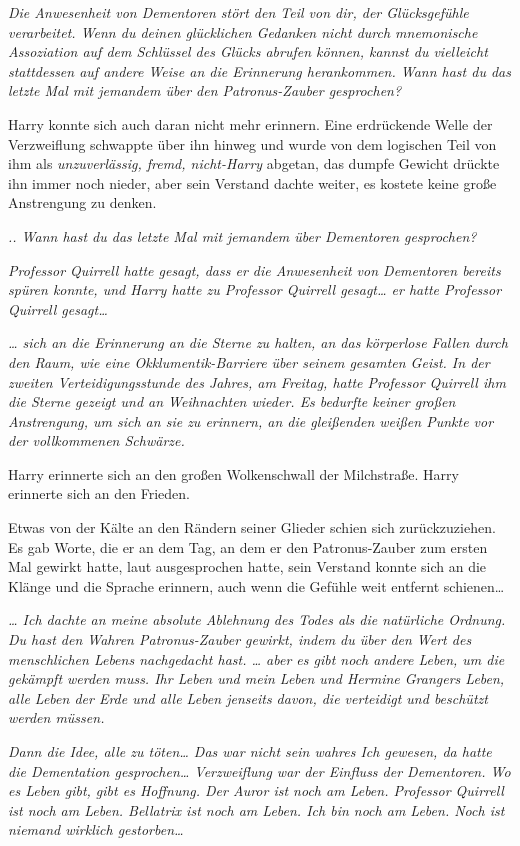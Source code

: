 {\emph{Die Anwesenheit von Dementoren stört den Teil von dir, der Glücksgefühle verarbeitet. Wenn du deinen glücklichen Gedanken nicht durch mnemonische Assoziation auf dem Schlüssel des Glücks abrufen können, kannst du vielleicht stattdessen auf andere Weise an die Erinnerung herankommen. Wann hast du das letzte Mal mit jemandem über den Patronus-Zauber gesprochen?}

Harry konnte sich auch daran nicht mehr erinnern. Eine erdrückende Welle der Verzweiflung schwappte über ihn hinweg und wurde von dem logischen Teil von ihm als \emph{unzuverlässig, fremd, nicht-Harry} abgetan, das dumpfe Gewicht drückte ihn immer noch nieder, aber sein Verstand dachte weiter, es kostete keine große Anstrengung zu denken.

\emph{.. Wann hast du das letzte Mal mit jemandem über Dementoren gesprochen?}

\emph{Professor Quirrell hatte gesagt, dass er die Anwesenheit von Dementoren bereits spüren konnte, und Harry hatte zu Professor Quirrell gesagt… er hatte Professor Quirrell gesagt…}

\emph{… sich an die Erinnerung an die Sterne zu halten, an das körperlose Fallen durch den Raum, wie eine Okklumentik-Barriere über seinem gesamten Geist. In der zweiten Verteidigungsstunde des Jahres, am Freitag, hatte Professor Quirrell ihm die Sterne gezeigt und an Weihnachten wieder. Es bedurfte keiner großen Anstrengung, um sich an sie zu erinnern, an die gleißenden weißen Punkte vor der vollkommenen Schwärze.}

Harry erinnerte sich an den großen Wolkenschwall der Milchstraße. Harry erinnerte sich an den Frieden.

Etwas von der Kälte an den Rändern seiner Glieder schien sich zurückzuziehen. Es gab Worte, die er an dem Tag, an dem er den Patronus-Zauber zum ersten Mal gewirkt hatte, laut ausgesprochen hatte, sein Verstand konnte sich an die Klänge und die Sprache erinnern, auch wenn die Gefühle weit entfernt schienen…

\emph{… Ich dachte an meine absolute Ablehnung des Todes als die natürliche Ordnung. Du hast den Wahren Patronus-Zauber gewirkt, indem du über den Wert des menschlichen Lebens nachgedacht hast. … aber es gibt noch andere Leben, um die gekämpft werden muss. Ihr Leben und mein Leben und Hermine Grangers Leben, alle Leben der Erde und alle Leben jenseits davon, die verteidigt und beschützt werden müssen.}

\emph{Dann die Idee, alle zu töten… Das war nicht sein wahres Ich gewesen, da hatte die Dementation gesprochen… Verzweiflung war der Einfluss der Dementoren. Wo es Leben gibt, gibt es Hoffnung. Der Auror ist noch am Leben. Professor Quirrell ist noch am Leben. Bellatrix ist noch am Leben. Ich bin noch am Leben. Noch ist niemand wirklich gestorben…}

}
